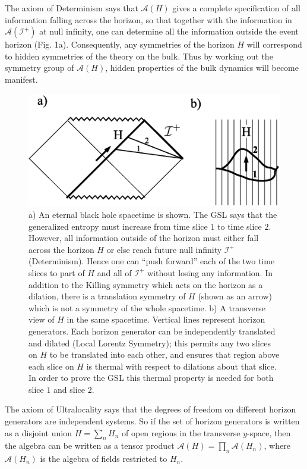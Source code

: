 \documentclass[12pt]{article}
\begin{document}
The axiom of Determinism says that $\mathcal{A}(H)$ gives a complete specification of all information falling across the horizon, so that together with the information in $\mathcal{A}(\mathcal{I}^+)$ at null infinity, one can determine all the information outside the event horizon (Fig. 1a).  Consequently, any symmetries of the horizon $H$ will correspond to hidden symmetries of the theory on the bulk.  Thus by working out the symmetry group of $\mathcal{A}(H)$, hidden properties of the bulk dynamics will become manifest.

\begin{figure}[ht]
\centering
\includegraphics[width=.85\textwidth]{nullslice.eps}
\caption{\footnotesize a) An eternal black hole spacetime is shown.  The GSL says that the generalized entropy must increase from time slice $1$ to time slice $2$.  However, all information outside of the horizon must either fall across the horizon $H$ or else reach future null infinity $\mathcal{I}^+$ (Determinism).  Hence one can ``push forward'' each of the two time slices to part of $H$ and all of $\mathcal{I}^+$ without losing any information.  In addition to the Killing symmetry which acts on the horizon as a dilation, there is a translation symmetry of $H$ (shown as an arrow) which is not a symmetry of the whole spacetime.
b) A transverse view of $H$ in the same spacetime.  Vertical lines represent horizon generators.  Each horizon generator can be independently translated and dilated (Local Lorentz Symmetry); this permits any two slices on $H$ to be translated into each other, and ensures that region above each slice on $H$ is thermal with respect to dilations about that slice.  In order to prove the GSL this thermal property is needed for both slice $1$ and slice $2$.
} \label{nullslice}
\end{figure}

The axiom of Ultralocality says that the degrees of freedom on different horizon generators are independent systems.  So if the set of horizon generators is written as a disjoint union $H = \sum_n H_n$ of open regions in the transverse $y$-space, then the algebra can be written as a tensor product $\mathcal{A}(H) = \prod_n \mathcal{A}(H_n)$, where $\mathcal{A}(H_n)$ is the algebra of fields restricted to $H_n$.
\end{document}
